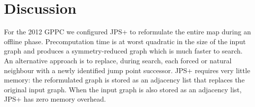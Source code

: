 \section{Discussion}
For the 2012 GPPC we configured 
JPS+ to reformulate the entire map during an offline phase.
Precomputation time is at worst quadratic in the size of the input graph
and produces a symmetry-reduced graph which is much faster
to search. 
An alternative approach is to replace, during search, each forced or 
natural neighbour with a newly identified jump point successor.
JPS+ requires very little memory: the reformulated graph
is stored as an adjacency list that replaces the original input graph.
When the input graph is also stored as an adjacency list, JPS+
has zero memory overhead.
